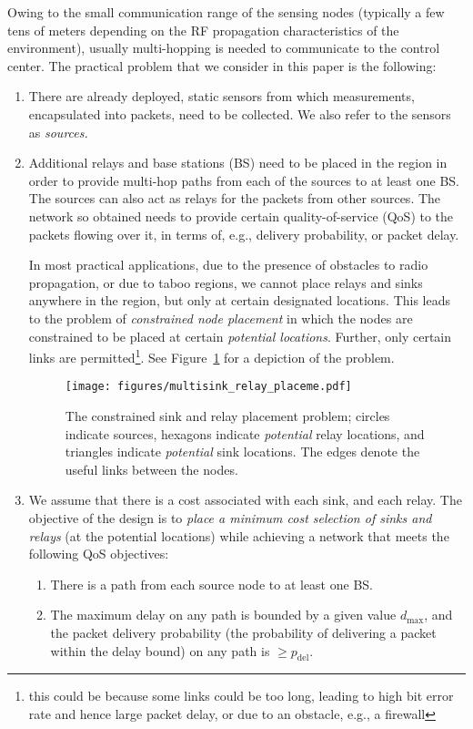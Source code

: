 \documentclass[conference]{IEEEtran}
\begin{document}
Owing to the small communication range of the sensing nodes (typically a few tens of meters depending on the RF propagation characteristics of the environment), usually multi-hopping is needed to communicate to the control center. The practical problem that we consider in this paper is the following:

\begin{enumerate}
\item There are already deployed, static sensors from which measurements, encapsulated into packets, need to be collected. We also refer to the sensors as \emph{sources.}
\item Additional relays and base stations (BS) need to be placed in the region in order to provide multi-hop paths from each of the sources to at least one BS. The sources can also act as relays for the packets from other sources. The network so obtained needs to provide certain quality-of-service (QoS) to the packets flowing over it, in terms of, e.g., delivery probability, or packet delay. 

In most practical applications, due to the presence of obstacles to radio propagation, or due to taboo regions, we cannot place relays and sinks anywhere in the region, but only at certain designated locations. This leads to the problem of \emph{constrained node placement} in which the nodes are constrained to be placed at certain \emph{potential locations}. Further, only certain links are permitted\footnote{this could be because some links could be too long, leading to high bit error rate and hence large packet delay, or due to an obstacle, e.g., a firewall}. See Figure~\ref{fig:constrained} for a depiction of the problem.

\begin{figure}[t]
\begin{center}
\texttt{[image: figures/multisink\_relay\_placeme.pdf]}
\end{center}
\caption{The constrained sink and relay placement problem; circles indicate sources, hexagons indicate \emph{potential} relay locations, and triangles indicate \emph{potential} sink locations. The edges denote the useful links between the nodes.}
\label{fig:constrained}
\end{figure} 

\item We assume that there is a cost associated with each sink, and each relay. The objective of the design is to \emph{place a minimum cost selection of sinks and relays} (at the potential locations) while achieving a network that meets the following QoS objectives:
\begin{enumerate}
\item There is a path from each source node to at least one BS.
\item The maximum delay on any path is bounded by a given value $d_{\max}$, and the packet delivery probability (the probability of delivering a packet within the delay bound) on any path is $\geq p_{\mathrm{del}}$.
\end{enumerate}
\end{enumerate}
\end{document}
